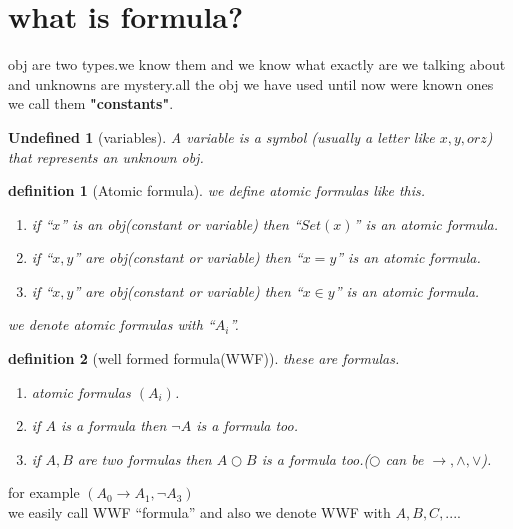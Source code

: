 \documentclass[10pt,a4paper]{book}
\newtheorem{undefined}{Undefined}[section]
\newtheorem{definition}{definition}[section]
\begin{document}
\section{what is formula?}

obj are two types.we know them and we know what exactly are we talking about
and unknowns are mystery.all the obj we have used until now were known ones we
call them \textbf{"constants"}.

\begin{undefined} [variables] A variable is a symbol
    (usually a letter like $x, y, or z$)
    that represents an unknown obj.
\end{undefined}

\begin{definition}[Atomic formula] we define atomic formulas like this.

    \begin{enumerate}
        \setlength{\itemsep}{0pt} %
        \item if ``$x$'' is an obj(constant or variable) then ``$Set(x)$'' is an atomic
              formula.
        \item if ``$x,y$'' are obj(constant or variable) then ``$x=y$'' is an atomic formula.
        \item if ``$x,y$'' are obj(constant or variable) then ``$x \in y$'' is an atomic
              formula.
    \end{enumerate}
    we denote atomic formulas with ``$A_{i}$''.
\end{definition}

%
\begin{definition}
    [well formed formula(WWF)] these are formulas.

    \begin{enumerate}
        \setlength{\itemsep}{0pt} %
        \item atomic formulas $(A_{i})$.
        \item if $A$ is a formula then $\neg A$ is a formula too.
        \item if $A ,B$ are two formulas then $A \bigcirc B $ is a formula too.($\bigcirc $
              can be $\to,\land ,\lor$).
    \end{enumerate}

\end{definition}
for example $(A_0 \to A_1 ,\neg A_3)$ \\ we easily call WWF ``formula'' and
also we denote WWF with $A ,B ,C ,...$.
\end{document}
